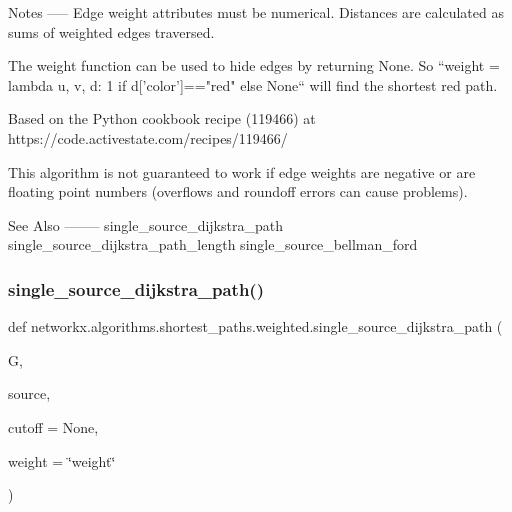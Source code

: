 \begin{DoxyVerb}
Notes
-----
Edge weight attributes must be numerical.
Distances are calculated as sums of weighted edges traversed.

The weight function can be used to hide edges by returning None.
So ``weight = lambda u, v, d: 1 if d['color']=="red" else None``
will find the shortest red path.

Based on the Python cookbook recipe (119466) at
https://code.activestate.com/recipes/119466/

This algorithm is not guaranteed to work if edge weights
are negative or are floating point numbers
(overflows and roundoff errors can cause problems).

See Also
--------
single_source_dijkstra_path
single_source_dijkstra_path_length
single_source_bellman_ford
\end{DoxyVerb}
 \mbox{\label{namespacenetworkx_1_1algorithms_1_1shortest__paths_1_1weighted_a9fce3a81151f15473e1801803a3a1028}} 
\subsubsection{\texorpdfstring{single\+\_\+source\+\_\+dijkstra\+\_\+path()}{single\_source\_dijkstra\_path()}}
{\footnotesize\ttfamily def networkx.\+algorithms.\+shortest\+\_\+paths.\+weighted.\+single\+\_\+source\+\_\+dijkstra\+\_\+path (\begin{DoxyParamCaption}\item[{}]{G,  }\item[{}]{source,  }\item[{}]{cutoff = {\ttfamily None},  }\item[{}]{weight = {\ttfamily \char`\"{}weight\char`\"{}} }\end{DoxyParamCaption})}

